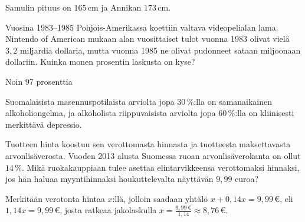 \begin{tehtavasivu}
\begin{tehtava}
    Samulin pituus on $165$\,cm ja Annikan $173$\,cm.
    \begin{vastaus}
    \end{vastaus}
\end{tehtava}

\begin{tehtava}
Vuosina 1983--1985 Pohjois-Amerikassa koettiin valtava videopelialan lama. Nintendo of American mukaan alan vuosittaiset tulot vuonna 1983 olivat vielä $3,2$ miljardia dollaria, mutta vuonna 1985 ne olivat pudonneet sataan miljoonaan dollariin. Kuinka monen prosentin laskusta on kyse?
	\begin{vastaus}
Noin $97$ prosenttia
	\end{vastaus}
\end{tehtava}

\begin{tehtava}
Suomalaisista masennuspotilaista arviolta jopa $30$\,\%:lla on samanaikainen alkoholiongelma, ja alkoholista riippuvaisista arviolta jopa $60$\,\%:lla on kliinisesti merkittävä depressio.
	\begin{vastaus}
	\end{vastaus}
\end{tehtava}

\begin{tehtava} %
Tuotteen hinta koostuu sen verottomasta hinnasta ja tuotteesta maksettavasta arvonlisäverosta. Vuoden 2013 alusta Suomessa ruoan arvonlisäverokanta on ollut $14\,\%$. Mikä ruokakauppiaan tulee asettaa elintarvikkeensa verottomaksi hinnaksi, jos hän haluaa myyntihinnaksi houkuttelevalta näyttävän $9,99$ euroa?
	\begin{vastaus}
	Merkitään verotonta hintaa $x$:llä, jolloin saadaan yhtälö $x+0,14x=9,99\,€$, eli $1,14x=9,99\,€$, josta ratkeaa jakolaskulla $x=\frac{9,99\,€}{1,14}\approx 8,76\,€$. 
	\end{vastaus}
\end{tehtava}


\end{tehtavasivu}
